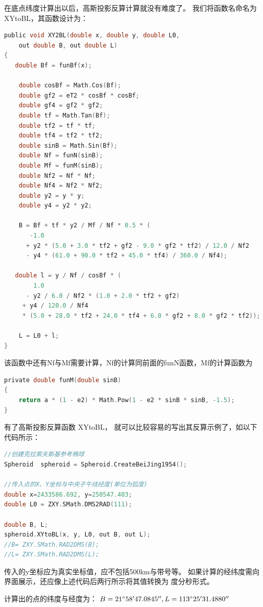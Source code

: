  在底点纬度计算出以后，高斯投影反算计算就没有难度了。
 我们将函数名命名为 XYtoBL，其函数设计为：
 \begin{lstlisting}[language=C]
public void XY2BL(double x, double y, double L0,
    out double B, out double L)
{
   double Bf = funBf(x);

    double cosBf = Math.Cos(Bf);
    double gf2 = eT2 * cosBf * cosBf;
    double gf4 = gf2 * gf2;
    double tf = Math.Tan(Bf);
    double tf2 = tf * tf;
    double tf4 = tf2 * tf2;
    double sinB = Math.Sin(Bf);
    double Nf = funN(sinB);
    double Mf = funM(sinB);
    double Nf2 = Nf * Nf;
    double Nf4 = Nf2 * Nf2;
    double y2 = y * y;
    double y4 = y2 * y2;

    B = Bf + tf * y2 / Mf / Nf * 0.5 * (
       -1.0
      + y2 * (5.0 + 3.0 * tf2 + gf2 - 9.0 * gf2 * tf2) / 12.0 / Nf2
      - y4 * (61.0 + 90.0 * tf2 + 45.0 * tf4) / 360.0 / Nf4);

   double l = y / Nf / cosBf * (
        1.0
      - y2 / 6.0 / Nf2 * (1.0 + 2.0 * tf2 + gf2)
     + y4 / 120.0 / Nf4
     * (5.0 + 28.0 * tf2 + 24.0 * tf4 + 6.0 * gf2 + 8.0 * gf2 * tf2));

    L = L0 + l;
}
\end{lstlisting}

该函数中还有Nf与Mf需要计算，Nf的计算同前面的funN函数，Mf的计算函数为
 \begin{lstlisting}[language=C]
private double funM(double sinB)
{
    return a * (1 - e2) * Math.Pow(1 - e2 * sinB * sinB, -1.5);
}
\end{lstlisting}

 有了高斯投影反算函数 XYtoBL， 就可以比较容易的写出其反算示例了，如以下代码所示：

\begin{lstlisting}[language=C]
//创建克拉索夫斯基参考椭球
Spheroid  spheroid = Spheroid.CreateBeiJing1954();

//传入点的X、Y坐标与中央子午线经度(单位为弧度)
double x=2433586.692, y=250547.403;
double L0 = ZXY.SMath.DMS2RAD(111);

double B, L;
spheroid.XYtoBL(x, y, L0, out B, out L);
//B= ZXY.SMath.RAD2DMS(B);
//L= ZXY.SMath.RAD2DMS(L);
\end{lstlisting}

传入的y坐标应为真实坐标值，应不包括500km与带号等。
如果计算的经纬度需向界面展示，还应像上述代码后两行所示将其值转换为
度分秒形式。

计算出的点的纬度与经度为：
$B=21 ^\circ 58'47.0845'', L=113^\circ 25'31.4880''$

